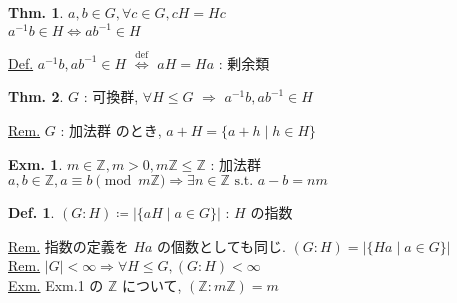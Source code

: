 \documentclass[uplatex,dvipdfmx,9pt]{beamer}
\newcommand{\defarrow}{\overset{\mathrm{def}}{\Leftrightarrow}}
\newcommand{\st}{\text{ s.t. }}
\newcounter{textExmCount}
\theoremstyle{definition} %
\newtheorem{defn}{Def.}[subsection] %
\newtheorem{thm}{Thm.}[subsection] %
\theoremstyle{example}
\newtheorem{exmText}[textExmCount]{Exm.}
\begin{document}
      \begin{frame}

        \begin{thm}
          $a,b \in G, \forall c \in G, cH = Hc$ \\
          $a^{-1}b \in H \Leftrightarrow ab^{-1} \in H$
        \end{thm}

        \underline{Def.} $a^{-1}b, ab^{-1} \in H$ $\defarrow$ $aH = Ha$ : 剰余類
      
        \begin{thm}
          $G$ : 可換群, $\forall H \le G$ $\Rightarrow$ $a^{-1}b, ab^{-1} \in H$
        \end{thm}

        \underline{Rem.} $G$ : 加法群 のとき, $a+H = \{a+h \mid h \in H\}$
        \begin{exmText}
          $m \in \mathbb{Z}, m > 0, m\mathbb{Z} \le \mathbb{Z}$ : 加法群 \\
          $a,b \in \mathbb{Z}, a \equiv b \pmod{m\mathbb{Z}} \Rightarrow \exists n \in \mathbb{Z} \st a-b = nm$ 
        \end{exmText}

        \begin{defn}
          $(G:H) \coloneqq | \{aH \mid a \in G\} |$ : $H$ の\alert{指数}
        \end{defn}
        \underline{Rem.} 指数の定義を $Ha$ の個数としても同じ. $(G:H) = | \{Ha \mid a \in G\} |$ \\
        \underline{Rem.} $|G| < \infty \Rightarrow \forall H \le G, (G:H) < \infty$ \\
        \underline{Exm.} Exm.1 の $\mathbb{Z}$ について, $(\mathbb{Z}:m\mathbb{Z}) = m$ \\

        \end{frame}
\end{document}
